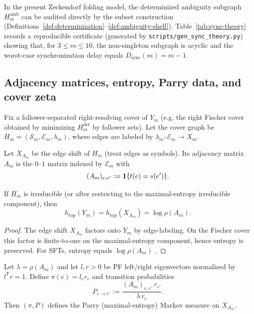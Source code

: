 \begin{remark}\label{rem:amb-shell-certificate}
In the present Zeckendorf folding model, the determinized ambiguity subgraph $H_m^{\mathrm{amb}}$ can be audited directly by the subset construction (Definitions~\ref{def:determinization}--\ref{def:ambiguity-shell}).
Table~\ref{tab:sync-theory} records a reproducible certificate (generated by \texttt{scripts/gen\_sync\_theory.py}) showing that, for $3\le m\le 10$, the non-singleton subgraph is acyclic and the worst-case synchronization delay equals $D_{\mathrm{sync}}(m)=m-1$.
\end{remark}

\subsection{Adjacency matrices, entropy, Parry data, and cover zeta}\label{subsec:cover-invariants}
Fix a follower-separated right-resolving cover of $Y_m$ (e.g. the right Fischer cover obtained by minimizing $H_m^{\mathrm{det}}$ by follower sets).
Let the cover graph be $H_m=(\mathcal{S}_m,\mathcal{E}_m,\lambda_m)$, where edges are labeled by $\lambda_m:\mathcal{E}_m\to X_m$.

\begin{definition}\label{def:adjacency}
Let $X_{A_m}$ be the edge shift of $H_m$ (treat edges as symbols).
Its adjacency matrix $A_m$ is the $0$--$1$ matrix indexed by $\mathcal{E}_m$ with
\[
(A_m)_{e,e'}:=\mathbf{1}\{t(e)=s(e')\}.
\]
\end{definition}

\begin{proposition}\label{prop:entropy-logrho}
If $H_m$ is irreducible (or after restricting to the maximal-entropy irreducible component), then
\[
h_{\mathrm{top}}(Y_m)=h_{\mathrm{top}}(X_{A_m})=\log\rho(A_m).
\]
\end{proposition}

\begin{proof}
The edge shift $X_{A_m}$ factors onto $Y_m$ by edge-labeling.
On the Fischer cover this factor is finite-to-one on the maximal-entropy component, hence entropy is preserved.
For SFTs, entropy equals $\log\rho(A_m)$ \cite{LindMarcus1995,Kitchens1998SymbolicDynamics}.
\end{proof}

\begin{proposition}\label{prop:parry}
Let $\lambda=\rho(A_m)$ and let $l,r>0$ be PF left/right eigenvectors normalized by $l^{\mathsf T}r=1$.
Define $\pi(e)=l_e r_e$ and transition probabilities
\[
P_{e\to e'}:=\frac{(A_m)_{e,e'}\,r_{e'}}{\lambda\,r_e}.
\]
Then $(\pi,P)$ defines the Parry (maximal-entropy) Markov measure on $X_{A_m}$.
\end{proposition}

